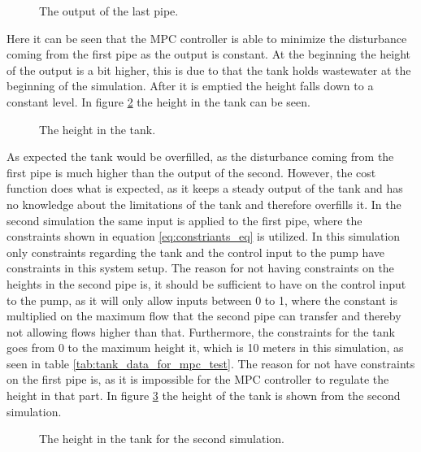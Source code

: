 \begin{figure}[H]
 \centering
 
\caption{The output of the last pipe.}
\label{fig:MPC_test_output_first_test}
\end{figure}

Here it can be seen that the MPC controller is able to minimize the disturbance coming from the first pipe as the output is constant. At the beginning the height of the output is a bit higher, this is due to that the tank holds wastewater at the beginning of the simulation. After it is emptied the height falls down to a constant level. In figure \ref{fig:tank_height_first_test} the height in the tank can be seen.  

\begin{figure}[H]
 \centering
 
\caption{The height in the tank.}
\label{fig:tank_height_first_test}
\end{figure}

As expected the tank would be overfilled, as the disturbance coming from the first pipe is much higher than the output of the second. However, the cost function does what is expected, as it keeps a steady output of the tank and has no knowledge about the limitations of the tank and therefore overfills it. In the second simulation the same input is applied to the first pipe, where the constraints shown in equation \ref{eq:constriants_eq} is utilized. In this simulation only constraints regarding the tank and the control input to the pump have constraints in this system setup. The reason for not having constraints on the heights in the second pipe is, it should be sufficient to have on the control input to the pump, as it will only allow inputs between 0 to 1, where the constant is multiplied on the maximum flow that the second pipe can transfer and thereby not allowing flows higher than that. Furthermore, the constraints for the tank goes from 0 to the maximum height it, which is 10 meters in this simulation, as seen in table \ref{tab:tank_data_for_mpc_test}. The reason for not have constraints on the first pipe is, as it is impossible for the MPC controller to regulate the height in that part. In figure \ref{fig:tank_height_second_test_with_constraints} the height of the tank is shown from the second simulation.        


\begin{figure}[H]
 \centering
 
\caption{The height in the tank for the second simulation.}
\label{fig:tank_height_second_test_with_constraints}
\end{figure}

